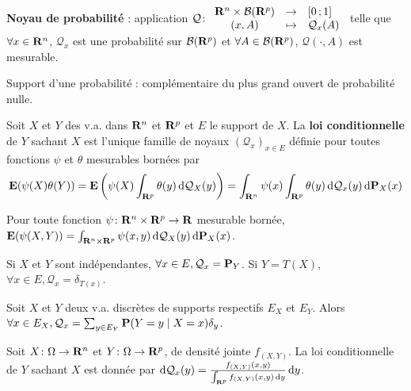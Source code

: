 \begin{defn}
	\textbf{Noyau de probabilité} : application $\mathcal{Q} \colon \begin{array}{ccl}
		\mathbf{R}^n \times \mathcal{B}(\mathbf{R}^p) & \to & \mathopen{}\mathclose{\left[0\mathclose{}\mathpunct{};1\right]} \\
		(x,A) & \mapsto & \mathcal{Q}_x(A)
	\end{array}$
	telle que $\forall x \in \mathbf{R}^n$, $\mathcal{Q}_x$ est une probabilité sur $\mathcal{B}(\mathbf{R}^p)$ et $\forall A \in \mathcal{B}(\mathbf{R}^p)$, $\mathcal{Q}(\cdot,A)$ est mesurable.
\end{defn}

\begin{defn}
	Support d'une probabilité : complémentaire du plus grand ouvert de probabilité nulle.
\end{defn}

\begin{defn}
	Soit $X$ et $Y$ des v.a. dans $\mathbf{R}^n$ et $\mathbf{R}^p$ et $E$ le support de $X$.
	La \textbf{loi conditionnelle} de $Y$ sachant $X$ est l'unique famille de noyaux $(\mathcal{Q}_x)_{x \in E}$ définie pour toutes fonctions $\psi$ et $\theta$ mesurables bornées par
	$$\mathbf{E}(\psi(X) \theta(Y)) = \mathbf{E} \left( \psi(X) \int_{\mathbf{R}^p} \theta(y) \mathop{}\mathopen{}\mathrm{d} \mathcal{Q}_X(y) \right) = \int_{\mathbf{R}^n} \psi(x) \int_{\mathbf{R}^p} \theta(y) \mathop{}\mathopen{}\mathrm{d} \mathcal{Q}_x(y) \mathop{}\mathopen{}\mathrm{d} \mathbf{P}_X(x)$$
\end{defn}

\begin{thm}
	Pour toute fonction $\psi \colon \mathbf{R}^n \times \mathbf{R}^p \to \mathbf{R}$ mesurable bornée, $\mathbf{E}(\psi(X,Y)) = \int_{\mathbf{R}^n \times \mathbf{R}^p} \psi(x,y) \mathop{}\mathopen{}\mathrm{d} \mathcal{Q}_X(y) \mathop{}\mathopen{}\mathrm{d} \mathbf{P}_X(x)$.
\end{thm}

\begin{thm}
	Si $X$ et $Y$ sont indépendantes, $\forall x \in E, \mathcal{Q}_x = \mathbf{P}_Y$.
	Si $Y = T(X)$, $\forall x \in E, \mathcal{Q}_x = \delta_{T(x)}$.
\end{thm}

\begin{thm}
	Soit $X$ et $Y$ deux v.a. discrètes de supports respectifs $E_X$ et $E_Y$.
	Alors $\forall x \in E_X, \mathcal{Q}_x = \sum_{y \in E_Y} \mathbf{P}(Y = y \mid X = x) \delta_y$.
\end{thm}

\begin{thm}
	Soit $X \colon \Omega \to \mathbf{R}^n$ et $Y \colon \Omega \to \mathbf{R}^p$, de densité jointe $f_{(X,Y)}$.
	La loi conditionnelle de $Y$ sachant $X$ est donnée par $\mathop{}\mathopen{}\mathrm{d} \mathcal{Q}_x(y) = \frac{f_{(X,Y)}(x,y)}{\int_{\mathbf{R}^p} f_{(X,Y)}(x,y) \mathop{}\mathopen{}\mathrm{d} y} \mathop{}\mathopen{}\mathrm{d} y$.
\end{thm}

